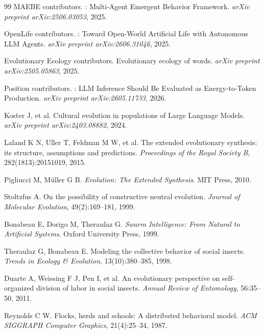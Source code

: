\documentclass[12pt,a4paper]{ctexart}
\begin{document}
\begin{thebibliography}{99}
MAEBE contributors.
: Multi-Agent Emergent Behavior Framework.
\newblock \emph{arXiv preprint arXiv:2506.03053}, 2025.

OpenLife contributors.
: Toward Open-World Artificial Life with Autonomous LLM Agents.
\newblock \emph{arXiv preprint arXiv:2606.31046}, 2025.

Evolutionary Ecology contributors.
\newblock Evolutionary ecology of words.
\newblock \emph{arXiv preprint arXiv:2505.05863}, 2025.

{Position} contributors.
: LLM Inference Should Be Evaluated as Energy-to-Token Production.
\newblock \emph{arXiv preprint arXiv:2605.11733}, 2026.

Koster J, et al.
\newblock Cultural evolution in populations of Large Language Models.
\newblock \emph{arXiv preprint arXiv:2403.08882}, 2024.

Laland K N, Uller T, Feldman M W, et al.
\newblock The extended evolutionary synthesis: its structure, assumptions and predictions.
\newblock \emph{Proceedings of the Royal Society B}, 282(1813):20151019, 2015.

Pigliucci M, M{\"u}ller G B.
\newblock \emph{Evolution: The Extended Synthesis}.
\newblock MIT Press, 2010.

Stoltzfus A.
\newblock On the possibility of constructive neutral evolution.
\newblock \emph{Journal of Molecular Evolution}, 49(2):169--181, 1999.

Bonabeau E, Dorigo M, Theraulaz G.
\newblock \emph{Swarm Intelligence: From Natural to Artificial Systems}.
\newblock Oxford University Press, 1999.

Theraulaz G, Bonabeau E.
\newblock Modeling the collective behavior of social insects.
\newblock \emph{Trends in Ecology \& Evolution}, 13(10):380--385, 1998.

Duarte A, Weissing F J, Pen I, et al.
\newblock An evolutionary perspective on self-organized division of labor in social insects.
\newblock \emph{Annual Review of Entomology}, 56:35--50, 2011.

Reynolds C W.
\newblock Flocks, herds and schools: A distributed behavioral model.
\newblock \emph{ACM SIGGRAPH Computer Graphics}, 21(4):25--34, 1987.


\end{thebibliography}
\end{document}
